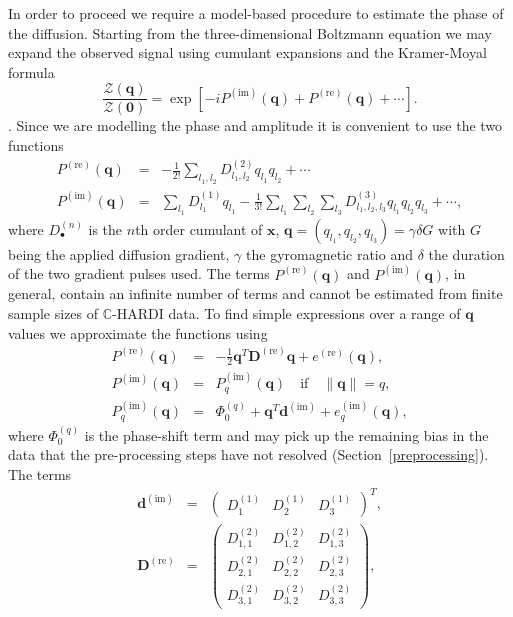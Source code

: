 \documentclass[authoryear,preprint,12pt]{elsarticle}
\newcommand{\re}{\text{re}}
\newcommand{\im}{\text{im}}
\newcommand{\bd}{\mathbf{d}}
\newcommand{\bD}{\mathbf{D}}
\newcommand{\q}{\mathbf{q}}
\newcommand{\x}{\mathbf{x}}
\newcommand{\bbC}{\mathbb{C}}
\newcommand{\cZ}{\mathcal{Z}}
\begin{document}
In order to proceed we require a model-based procedure to estimate the
phase of the diffusion.  Starting from the three-dimensional Boltzmann
equation we may expand the observed signal using cumulant expansions
and the Kramer-Moyal formula 
\begin{equation}\label{kramermoyal}
  \frac{\cZ(\q)}{\cZ({\mathbf{0}})} = \exp\left[-iP^{(\im)}(\q) +
  P^{(\re)}(\q) + \cdots \right].
\end{equation}
\citep{Callaghan,Liu2004,Liu2005}.  Since we are modelling the phase
and amplitude it is convenient to use the two functions
\begin{eqnarray}
  P^{(\re)}(\q) &=& -\frac{1}{2!}\sum_{l_1,l_2} D^{(2)}_{l_1,l_2}
  q_{l_1}q_{l_2} + \cdots\\ 
  P^{(\im)}(\q) &=& \sum_{l_1} D^{(1)}_{l_1} q_{l_1} - \frac{1}{3!}
  \sum_{l_1}\sum_{l_2}\sum_{l_3} D^{(3)}_{l_1,l_2,l_3} q_{l_1} q_{l_2}
  q_{l_3} + \cdots,
\end{eqnarray}
where $D^{(n)}_{\bullet}$ is the $n$th order cumulant of $\x$,
$\q=(q_{l_1},q_{l_2},q_{l_3})=\gamma\delta{G}$ with $G$ being the
applied diffusion gradient, $\gamma$ the gyromagnetic ratio and
$\delta$ the duration of the two gradient pulses used.  The terms
$P^{(\re)}(\q)$ and $P^{(\im)}(\q)$, in general, contain an infinite
number of terms and cannot be estimated from finite sample sizes of
$\bbC$-HARDI data.  To find simple expressions over a range of $\q$
values we approximate the functions using
\begin{eqnarray}
  \nonumber
  P^{(\re)}(\q) &=& -\frac{1}{2} \q^T\bD^{(\re)}\q + e^{(\re)}(\q),\\
  \nonumber
  P^{(\im)}(\q) &=& P^{(\im)}_q(\q) \quad \text{if} \quad \|\q\|=q,\\
  \label{taylor:phase2}
  P^{(\im)}_q(\q) &=& \Phi_0^{(q)} + \q^T\bd^{(\im)} + e^{(\im)}_q(\q),
\end{eqnarray}
where $\Phi_0^{(q)}$ is the phase-shift term and may pick up the
remaining bias in the data that the pre-processing steps have not
resolved (Section~\ref{preprocessing}).  The terms
\begin{eqnarray}
  \bd^{(\im)} &=& \begin{pmatrix}
    D^{(1)}_{1} & D^{(1)}_{2} & D^{(1)}_{3}
  \end{pmatrix}^T,\\
  \bD^{(\re)} &=& \begin{pmatrix}
    D_{1,1}^{(2)} & D_{1,2}^{(2)} & D_{1,3}^{(2)}\\
    D_{2,1}^{(2)} & D_{2,2}^{(2)} & D_{2,3}^{(2)}\\
    D_{3,1}^{(2)} & D_{3,2}^{(2)} & D_{3,3}^{(2)}
  \end{pmatrix},
\end{eqnarray}
\end{document}
